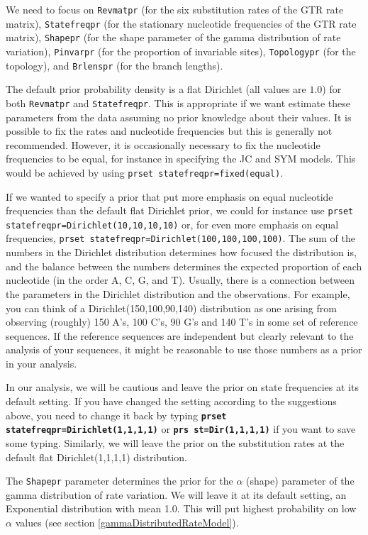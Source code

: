 \documentclass[12pt]{book}
\newcommand{\ttt}[1]{\texttt{#1}}
\newcommand{\tb}[1]{\ttt{\textbf{#1}}}
\begin{document}
We need to focus on \texttt{Revmatpr} (for the six substitution rates of the GTR rate matrix),
\texttt{Statefreqpr} (for the stationary nucleotide frequencies of the GTR rate matrix),
\texttt{Shapepr} (for the shape parameter of the gamma distribution of rate variation),
\texttt{Pinvarpr} (for the proportion of invariable sites), \texttt{Topologypr} (for the topology),
and \texttt{Brlenspr} (for the branch lengths).

The default prior probability density is a flat Dirichlet (all values are $1.0$) for both
\texttt{Revmatpr} and \texttt{Statefreqpr}. This is appropriate if we want estimate these
parameters from the data assuming no prior knowledge about their values. It is possible to fix the
rates and nucleotide frequencies but this is generally not recommended. However, it is occasionally
necessary to fix the nucleotide frequencies to be equal, for instance in specifying the JC and SYM
models.  This would be achieved by using \texttt{prset statefreqpr=fixed(equal)}.

If we wanted to specify a prior that put more emphasis on equal nucleotide frequencies than the
default flat Dirichlet prior, we could for instance use \texttt{prset
statefreqpr=Dirichlet(10,10,10,10)} or, for even more emphasis on equal frequencies, \texttt{prset
statefreqpr=Dirichlet(100,100,100,100)}. The sum of the numbers in the Dirichlet distribution
determines how focused the distribution is, and the balance between the numbers determines the
expected proportion of each nucleotide (in the order A, C, G, and T). Usually, there is a
connection between the parameters in the Dirichlet distribution and the observations. For example,
you can think of a Dirichlet(150,100,90,140) distribution as one arising from observing (roughly)
150 A's, 100 C's, 90 G's and 140 T's in some set of reference sequences. If the reference sequences
are independent but clearly relevant to the analysis of your sequences, it might be reasonable to
use those numbers as a prior in your analysis.

In our analysis, we will be cautious and leave the prior on state frequencies at its default
setting. If you have changed the setting according to the suggestions above, you need to change it
back by typing \tb{prset statefreqpr=Dirichlet(1,1,1,1)} or \tb{prs st=Dir(1,1,1,1)} if you want to
save some typing. Similarly, we will leave the prior on the substitution rates at the default flat
Dirichlet(1,1,1,1) distribution.

The \texttt{Shapepr} parameter determines the prior for the $\alpha$ (shape) parameter of the gamma
distribution of rate variation. We will leave it at its default setting, an Exponential
distribution with mean 1.0. This will put highest probability on low $\alpha$ values (see section
\ref{gammaDistributedRateModel}).
\end{document}
